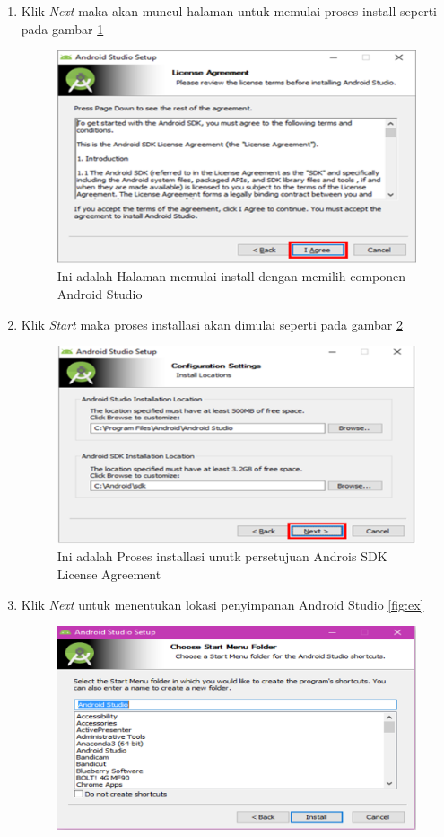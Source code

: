 \begin{enumerate}
	\item Klik \textit{Next} maka akan muncul halaman untuk memulai proses install seperti pada gambar \ref{fig:start}
		 \begin{figure}[!htbp]
  		 \centering
 		 \includegraphics[width=.75\textwidth]{figures/In6.png}
  		 \caption{Ini adalah Halaman memulai install dengan memilih componen Android Studio}\label{fig:start}
		 \end{figure}
	\item Klik \textit{Start} maka proses installasi akan dimulai seperti pada gambar \ref{fig:proses}
		 \begin{figure}[!htbp]
  		 \centering
 		 \includegraphics[width=.75\textwidth]{figures/In7.png}
  		 \caption{Ini adalah Proses installasi unutk persetujuan Androis SDK License Agreement}\label{fig:proses}
		 \end{figure}
	\item  Klik \textit{Next} untuk menentukan lokasi penyimpanan Android Studio \ref{fig:ex}
		 \begin{figure}[!htbp]
  		 \centering
 		 \includegraphics[width=.75\textwidth]{figures/In8.png}

\end{figure}
\end{enumerate}
